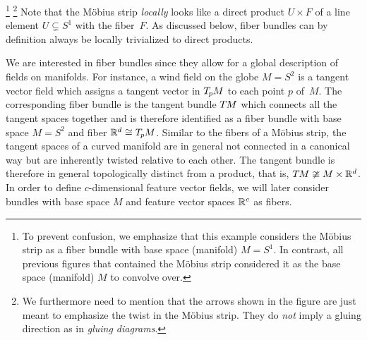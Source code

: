\footnote{
    To prevent confusion, we emphasize that this example considers the M{\"o}bius strip as a fiber bundle with base space (manifold) $M=S^1$.
    In contrast, all previous figures that contained the M{\"o}bius strip considered it as the base space (manifold) $M$ to convolve over.
}%
\footnote{
    We furthermore need to mention that the arrows shown in the figure are just meant to emphasize the twist in the M{\"o}bius strip.
    They do \emph{not} imply a gluing direction as in \emph{gluing diagrams}.
}
Note that the M{\"o}bius strip \emph{locally} looks like a direct product $U\times F$ of a line element $U\subsetneq S^1$ with the fiber~$F$.
As discussed below, fiber bundles can by definition always be locally trivialized to direct products.


We are interested in fiber bundles since they allow for a global description of fields on manifolds.
For instance, a wind field on the globe $M=S^2$ is a tangent vector field which assigns a tangent vector in $T_{\mkern-1.5mu p}\mkern-.5muM$ to each point $p$ of~$M$.
The corresponding fiber bundle is the tangent bundle $T\mkern-1.5muM$ which connects all the tangent spaces together and is therefore identified as a fiber bundle with base space $M=S^2$ and fiber $\mathbb{R}^d\cong T_{\mkern-1.5mu p}\mkern-.5muM$.
Similar to the fibers of a M{\"o}bius strip, the tangent spaces of a curved manifold are in general not connected in a canonical way but are inherently twisted relative to each other.
The tangent bundle is therefore in general topologically distinct from a product, that is, $T\mkern-1.5muM \ncong M\times\mathbb{R}^d$.
In order to define $c$-dimensional feature vector fields, we will later consider bundles with base space $M$ and feature vector spaces $\mathbb{R}^c$ as fibers.


